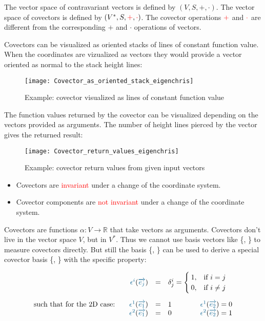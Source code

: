 The vector space of contravariant vectors is defined by $(V,S,+,\cdot)$. The vector space
of covectors is defined by $(V^*,S,\textcolor{red}{+},\textcolor{red}{\cdot})$. The
covector operations $\textcolor{red}{+}$ and $\textcolor{red}{\cdot}$ are different from
the corresponding $+$ and $\cdot$ operations of vectors.

Covectors can be visualized as oriented stacks of lines of constant function value. When
the coordinates are vizualized as vectors they would provide a vector oriented as normal
to the stack height lines:
\begin{figure}[h]
    \centering
    \texttt{[image: Covector\_as\_oriented\_stack\_eigenchris]}
    \caption{Example: covector visualized as lines of constant function value}
    \label{fig:covector_visualized}
\end{figure}

The function values returned by the covector can be visualized depending on the vectors
provided as arguments. The number of height lines pierced by the vector gives the returned
result:
\begin{figure}[h]
    \centering
    \texttt{[image: Covector\_return\_values\_eigenchris]}
    \caption{Example: covector return values from given input vectors}
    \label{fig:covector_return_values}
\end{figure}

\begin{itemize}
    \item Covectors are \textcolor{red}{invariant} under a change of the coordinate
    system.
    \item Covector components are \textcolor{red}{not invariant} under a change of the
    coordinate system.
\end{itemize}

Covectors are functions $\alpha: V \rightarrow \mathbb{R}$ that take vectors as arguments.
Covectors don't live in the vector space $V$, but in $V^*$. Thus we cannot use basis
vectors like \{, \} to measure covectors directly. But still the basis
\{, \} can be used to derive a special covector basis \{,
\} with the specific property:

\begin{equation}
    \label{eq:covec_vec_link}
    \begin{array}{rcl}
        \hdcbvc{i}(\hdbv{j}) & = &
        \delta^i_j = 
        \begin{cases}
            1, & \text{if}\ i = j \\
            0, & \text{if}\ i \neq j
        \end{cases} \\
        \noalign{\vskip10pt}
        \text{such that for the 2D case:}\qquad
        \hdcbvc{1}(\hdbv{1}) & = & 1 \qquad\qquad
        \hdcbvc{1}(\hdbv{2}) = 0 \\
        \hdcbvc{2}(\hdbv{1}) & = & 0 \qquad\qquad
        \hdcbvc{2}(\hdbv{2}) = 1
    \end{array}
\end{equation}

